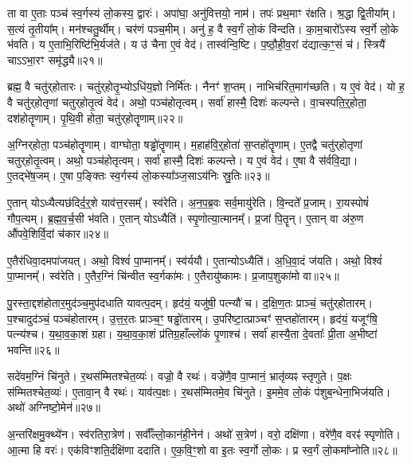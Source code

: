   ता वा ए॒ताः पञ्च॑ स्व॒र्गस्य॑ लो॒कस्य॒ द्वारः॑।
   अपा॑घा॒ अनु॑वित्तयो॒ नाम॑।
   तपः॑ प्रथ॒माꣳ र॑क्षति।
   श्र॒द्धा द्वि॒तीया᳚म्।
   स॒त्यं तृ॒तीया᳚म्।
   मन॑श्चतु॒र्थीम्।
   चर॑णं पञ्च॒मीम्।
   अनु॑ ह॒ वै स्व॒र्गं लो॒कं वि॑न्दति।
   का॒म॒चारो᳚ऽस्य स्व॒र्गे लो॒के भ॑वति।
   य ए॒ताभि॒रिष्टि॑भि॒र्यज॑ते।
   य उ॑ चैना ए॒वं वेद॑।
   तास्व॑न्वि॒ष्टि।
   प॒ष्ठौ॒ही॒व॒रां द॑द्यात्क॒ꣳ॒सं च॑।
   स्त्रियै॑ चाऽऽभा॒रꣳ समृ॑द्ध्यै॥२१॥\anuvakamend
  
   ब्रह्म॒ वै चतु॑र्‌होतारः।
   चतु॑र्‌होतृ॒भ्योऽधि॑य॒ज्ञो निर्मि॑तः।
   नैनꣳ॑ श॒प्तम्।
   नाभिच॑रित॒माग॑च्छति।
   य ए॒वं वेद॑।
   यो ह॒ वै चतु॑र्‌होतृणां चतुर्‌होतृ॒त्वं वेद॑।
   अथो॒ पञ्च॑होतृत्वम्।
   सर्वा॑ हास्मै॒ दिशः॑ कल्पन्ते।
   वा॒चस्पति॒र्‌॒होता॒ दश॑होतॄणाम्।
   पृ॒थि॒वी होता॒ चतु॑र्‌होतॄणाम्॥२२॥

   अ॒ग्निर्‌होता॒ पञ्च॑होतॄणाम्।
   वाग्घोता॒ षड्ढो॑तॄणाम्।
   म॒हाह॑वि॒र्‌॒होता॑ स॒प्तहो॑तॄणाम्।
   ए॒तद्वै चतु॑र्‌होतृणां चतुर्‌होतृ॒त्वम्।
   अथो॒ पञ्च॑होतृत्वम्।
   सर्वा॑ हास्मै॒ दिशः॑ कल्पन्ते।
   य ए॒वं वेद॑।
   ए॒षा वै स॑र्ववि॒द्या।
   ए॒तद्भे॑ष॒जम्।
   ए॒षा प॒ङ्क्तिः स्व॒र्गस्य॑ लो॒कस्या᳚ञ्ज॒साऽय॑निः स्रु॒तिः॥२३॥

   ए॒तान् योऽध्यैत्यछ॑दिर्द॒र्॒‌शे याव॑त्त॒रसम्᳚।
   स्व॑रेति।
   अ॒न॒प॒ब्र॒वः सर्व॒मायु॑रेति।
   वि॒न्दते᳚ प्र॒जाम्।
   रा॒यस्पोषं॑ गौप॒त्यम्।
   ब्र॒ह्म॒व॒र्च॒सी भ॑वति।
   ए॒तान् योऽध्यैति॑।
   स्पृ॒णोत्या॒त्मानम्᳚।
   प्र॒जां पि॒तॄन्।
   ए॒तान् वा अ॑रु॒ण औ॑पवे॒शिर्वि॒दां च॑कार॥२४॥

   ए॒तैर॑धिवा॒दमपा॑जयत्।
   अथो॒ विश्वं॑ पा॒प्मानम्᳚।
   स्व॑र्ययौ।
   ए॒तान्योऽध्यैति॑।
   अ॒धि॒वा॒दं ज॑यति।
   अथो॒ विश्वं॑ पा॒प्मानम्᳚।
   स्व॑रेति।
   ए॒तैर॒ग्निं चि॑न्वीत स्व॒र्गका॑मः।
   ए॒तैरायु॑ष्कामः।
   प्र॒जाप॒शुका॑मो वा॥२५॥

   पु॒रस्ता॒द्दश॑होतार॒मुद॑ञ्च॒मुप॑दधाति यावत्प॒दम्।
   हृद॑यं॒ यजु॑षी॒ पत्न्यौ॑ च।
   द॒क्षि॒ण॒तः प्राञ्चं॒ चतु॑र्‌होतारम्।
   प॒श्चादुद॑ञ्चं॒ पञ्च॑होतारम्।
   उ॒त्त॒र॒तः प्राञ्च॒ꣳ॒ षड्ढो॑तारम्।
   उ॒परि॑ष्टा॒त्प्राञ्चꣳ॑ स॒प्तहो॑तारम्।
   हृद॑यं॒ यजूꣳ॑षि॒ पत्न्य॑श्च।
   य॒था॒व॒का॒शं ग्रहा\sn{}।
   य॒था॒व॒का॒शं प्र॑तिग्र॒हाँल्लो॑कं  पृ॒णाश्च॑।
   सर्वा॑ हास्यै॒ता दे॒वताः᳚ प्री॒ता अ॒भीष्टा॑ भवन्ति॥२६॥

   सदे॑वम॒ग्निं चि॑नुते।
   र॒थस॑म्मितश्चेत॒व्यः॑।
   वज्रो॒ वै रथः॑।
   वज्रे॑णै॒व पा॒प्मानं॒ भ्रातृ॑व्यꣴ स्तृणुते।
   प॒क्षः स॑म्मितश्चेत॒व्यः॑।
   ए॒तावा॒न् वै रथः॑।
   याव॑त्प॒क्षः।
   र॒थस॑म्मितमे॒व चि॑नुते।
   इ॒ममे॒व लो॒कं प॑शुब॒न्धेना॒भिज॑यति।
   अथो॑ अग्निष्टो॒मेन॑॥२७॥

   अ॒न्तरि॑क्षमु॒क्थ्ये॑न।
   स्व॑रतिरा॒त्रेण॑।
   सर्वाँ᳚ल्लो॒कान॑ही॒नेन॑।
   अथो॑ स॒त्रेण॑।
   वरो॒ दक्षि॑णा।
   वरे॑णै॒व वरꣴ॑ स्पृणोति।
   आ॒त्मा हि वरः॑।
   एक॑विꣳशति॒र्दक्षि॑णा ददाति।
   ए॒क॒वि॒ꣳ॒शो वा इ॒तः स्व॒र्गो लो॒कः।
   प्र स्व॒र्गं लो॒कमा᳚प्नोति॥२८॥

